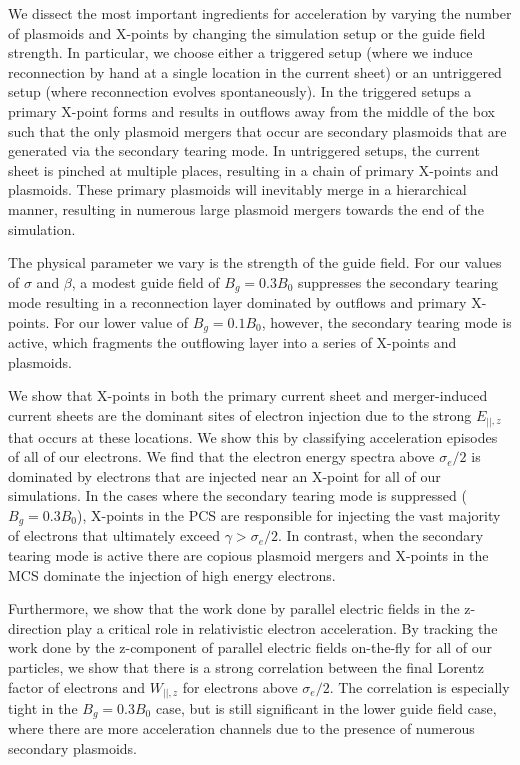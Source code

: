 We dissect the most important ingredients for acceleration by varying the number of plasmoids and X-points by changing the simulation setup or the guide field strength.  In particular, we choose either a triggered setup (where we induce reconnection by hand at a single location in the current sheet) or an untriggered setup (where reconnection evolves spontaneously).  In the triggered setups a primary X-point forms and results in outflows away from the middle of the box such that the only plasmoid mergers that occur are secondary plasmoids that are generated via the secondary tearing mode.  In untriggered setups, the current sheet is pinched at multiple places, resulting in a chain of primary X-points and plasmoids.  These primary plasmoids will inevitably merge in a hierarchical manner, resulting in numerous large plasmoid mergers towards the end of the simulation.  

The physical parameter we vary is the strength of the guide field.  For our values of $\sigma$ and $\beta$, a modest guide field of $B_{g}=0.3B_{0}$ suppresses the secondary tearing mode resulting in a reconnection layer dominated by outflows and primary X-points.  For our lower value of $B_{g}=0.1B_{0}$, however, the secondary tearing mode is active, which fragments the outflowing layer into a series of X-points and plasmoids.

We show that X-points in both the primary current sheet and merger-induced current sheets are the dominant sites of electron injection due to the strong $E_{||,z}$ that occurs at these locations.  We show this by classifying acceleration episodes of all of our electrons.  We find that the electron energy spectra above $\sigma_{e}/2$ is dominated by electrons that are injected near an X-point for all of our simulations.  In the cases where the secondary tearing mode is suppressed ($B_{g}=0.3B_{0}$), X-points in the PCS are responsible for injecting the vast majority of electrons that ultimately exceed $\gamma > \sigma_{e}/2$.  In contrast, when the secondary tearing mode is active there are copious plasmoid mergers and X-points in the MCS dominate the injection of high energy electrons.

Furthermore, we show that the work done by parallel electric fields in the z-direction play a critical role in relativistic electron acceleration.  By tracking the work done by the z-component of parallel electric fields on-the-fly for all of our particles, we show that there is a strong correlation between the final Lorentz factor of electrons and $W_{||,z}$ for electrons above $\sigma_{e}/2$.  The correlation is especially tight in the $B_{g}=0.3B_{0}$ case, but is still significant in the lower guide field case, where there are more acceleration channels due to the presence of numerous secondary plasmoids.

